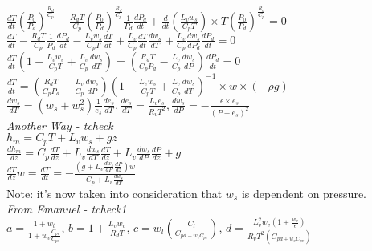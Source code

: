 \documentclass[11pt]{article} %
\begin{document}
$\frac{dT}{dt}(\frac{P_{0}}{P_{d}})^{\frac{R_{d}}{C_{p}}}  - \frac{R_{d}T}{C_{p}}(\frac{P_{0}}{P_{d}})^{\frac{R_{d}}{C_{p}}}\frac{1}{P_{d}}\frac{dP_{d}}{dt} + \frac{d}{dt} (\frac{L_{v}w_{s}}{C_{p}T}) \times T(\frac{P_{0}}{P_{d}})^{\frac{R_{d}}{C_{p}}} = 0$\\

$\frac{dT}{dt}  - \frac{R_{d}T}{C_{p}}\frac{1}{P_{d}}\frac{dP_{d}}{dt} - \frac{L_{v}w_{s}}{C_{p}T}\frac{dT}{dt} + \frac{L_{v}}{C_{p}}\frac{dT}{dt}\frac{dw_{s}}{dT}+ \frac{L_{v}}{C_{p}}\frac{dw_{s}}{dP_{d}}\frac{dP_{d}}{dt} = 0$\\

$\frac{dT}{dt}(1 - \frac{L_{v}w_{s}}{C_{p}T} + \frac{L_{v}}{C_{p}}\frac{dw_{s}}{dT}) = (\frac{R_{d}T}{C_{p}P_{d}} - \frac{L_{v}}{C_{p}}\frac{dw_{s}}{dP})\frac{dP_{d}}{dt} = 0$\\

$\frac{dT}{dt} = (\frac{R_{d}T}{C_{p}P_{d}} - \frac{L_{v}}{C_{p}}\frac{dw_{s}}{dP})(1 - \frac{L_{v}w_{s}}{C_{p}T} + \frac{L_{v}}{C_{p}}\frac{dw_{s}}{dT})^{-1} \times w \times (-\rho g)$\\

$\frac{dw_{s}}{dT} = (w_{s} + w_{s}^{2})\frac{1}{e_{s}}\frac{de_{s}}{dT}, \frac{de_{s}}{dT} = \frac{L_{v} e_{s}}{R_{v}T^{2}}, \frac{dw_{s}}{dP} = -\frac{\epsilon \times e_{s}}{(P - e_{s})^{2}}$ \\

\emph{Another Way - tcheck} \\

$h_{m} = C_{p}T + L_{v}w_{s} + gz$\\

$ \frac{dh_{m}}{dz} = C_{p} \frac{dT}{dz} + L_{v} \frac{dw_{s}}{dT} \frac{dT}{dz} + L_{v}\frac{dw_{s}}{dP} \frac{dP}{dz} + g $ \\

$ \frac{dT}{dz} w = \frac{dT}{dt} = - \frac{(g + L_{v}\frac{dw_{s}}{dP} \frac{dP}{dz})w}{C_{p} + L_{v} \frac{dw_{s}}{dT}} $\\

Note: it's now taken into consideration that $w_{s}$ is dependent on pressure.\\

\emph{From Emanuel - tcheck1} \\

$a = \frac{1 + w_{t}}{1 + w_{v}\frac{C_{pv}}{C_{pd}}}$, $b = 1 + \frac{L_{v}w_{v}}{R_{d}T}$, $c = w_{l}(\frac{C_{l}}{C_{pd + w_{v}C_{pv}}})$, $d = \frac{L_{v}^{2}w_{v}(1+\frac{w_{v}}{\epsilon})}{R_{v}T^{2}(C_{pd + w_{v}C_{pv}})}$\\
\end{document}
